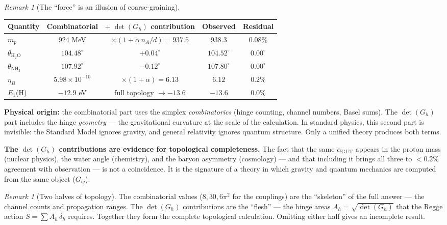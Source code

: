 \documentclass[12pt]{article}
\theoremstyle{remark}
\newtheorem{remark}[theorem]{Remark}
\theoremstyle{definition}
\begin{document}
\begin{remark}[The ``force'' is an illusion of coarse-graining]
\begin{center}
\begin{tabular}{lcccc}
\hline
Quantity & Combinatorial & $+\;\det(G_h)$ contribution & Observed & Residual \\
\hline
$m_p$ & 924 MeV & $\times(1 + \alpha\,n_A/d) = 937.5$ & 938.3 & 0.08\% \\
$\theta_{\text{H}_2\text{O}}$ & $104.48^\circ$ & $+ 0.04^\circ$ & $104.52^\circ$ & $0.00^\circ$ \\
$\theta_{\text{NH}_3}$ & $107.92^\circ$ & $- 0.12^\circ$ & $107.80^\circ$ & $0.00^\circ$ \\
$\eta_B$ & $5.98 \times 10^{-10}$ & $\times(1 + \alpha) = 6.13$ & $6.12$ & 0.2\% \\
$E_1$(H) & $-12.9$ eV & full topology $\to -13.6$ & $-13.6$ & 0.0\% \\
\hline
\end{tabular}
\end{center}

\textbf{Physical origin:} the combinatorial part uses the simplex \emph{combinatorics} (hinge counting, channel numbers, Basel sums). The $\det(G_h)$ part includes the hinge \emph{geometry} --- the gravitational curvature at the scale of the calculation. In standard physics, this second part is invisible: the Standard Model ignores gravity, and general relativity ignores quantum structure. Only a unified theory produces both terms.

\textbf{The $\det(G_h)$ contributions are evidence for topological completeness.} The fact that the same $\alpha_\text{GUT}$ appears in the proton mass (nuclear physics), the water angle (chemistry), and the baryon asymmetry (cosmology) --- and that including it brings all three to $< 0.2\%$ agreement with observation --- is not a coincidence. It is the signature of a theory in which gravity and quantum mechanics are computed from the same object ($G_{ij}$).

\begin{remark}[Two halves of topology]
The combinatorial values ($8, 30, 6\pi^2$ for the couplings) are the ``skeleton'' of the full answer --- the channel counts and propagation ranges. The $\det(G_h)$ contributions are the ``flesh'' --- the hinge areas $A_h = \sqrt{\det(G_h)}$ that the Regge action $S = \sum A_h\,\delta_h$ requires. Together they form the complete topological calculation. Omitting either half gives an incomplete result.
\end{remark}


\end{remark}
\end{document}
